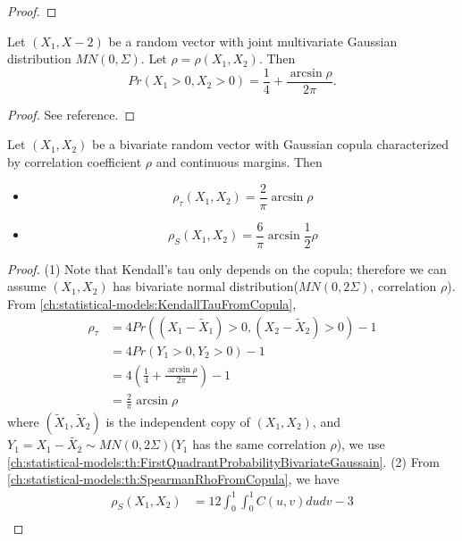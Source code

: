 \begin{refsection}
\begin{proof}
\end{proof}



\begin{lemma}\cite[215]{mcneil2015quantitative}\label{ch:statistical-models:th:FirstQuadrantProbabilityBivariateGaussain}
Let $(X_1,X-2)$ be a random vector with joint multivariate Gaussian distribution $MN(0,\Sigma)$. Let $\rho = \rho(X_1,X_2)$. Then
$$Pr(X_1>0, X_2>0) = \frac{1}{4}+ \frac{\arcsin \rho}{2\pi}.$$	
\end{lemma}
\begin{proof}
See reference. 
\end{proof}

\begin{lemma}\cite[215]{mcneil2015quantitative}\label{ch:statistical-models:th:RankCorrelationGaussianCopula}
Let $(X_1,X_2)$ be a bivariate random vector with Gaussian copula characterized by correlation coefficient $\rho$ and continuous margins. Then
\begin{itemize}
	\item $$\rho_\tau(X_1,X_2) = \frac{2}{\pi}\arcsin \rho$$	
	\item $$\rho_S(X_1,X_2) = \frac{6}{\pi}\arcsin \frac{1}{2}\rho$$	
\end{itemize}	
\end{lemma}
\begin{proof}
(1) Note that Kendall's tau only depends on the copula; therefore we can assume $(X_1,X_2)$ has bivariate normal distribution($MN(0,2\Sigma)$, correlation $\rho$). From \autoref{ch:statistical-models:KendallTauFromCopula},
\begin{align*}
\rho_\tau &= 4Pr((X_1-\tilde{X}_1)>0,(X_2 - \tilde{X}_2)>0) - 1 \\
&=4Pr(Y_1>0,Y_2>0) - 1 \\
&=4(\frac{1}{4}+ \frac{\arcsin \rho}{2\pi}) - 1\\
&=\frac{2}{\pi}\arcsin \rho
\end{align*}
where $(\tilde{X}_1,\tilde{X}_2)$ is the independent copy of $(X_1,X_2)$, and $Y_1 = X_1-\tilde{X_2}\sim MN(0,2\Sigma)$($Y_1$ has the same correlation $\rho$), we use \autoref{ch:statistical-models:th:FirstQuadrantProbabilityBivariateGaussain}.
(2) From \autoref{ch:statistical-models:th:SpearmanRhoFromCopula}, we have
\begin{align*}
\rho_S(X_1,X_2) &= 12\int_0^1\int_0^1 C(u,v)dudv - 3 \\

\end{align*}
\end{proof}
\end{refsection}

